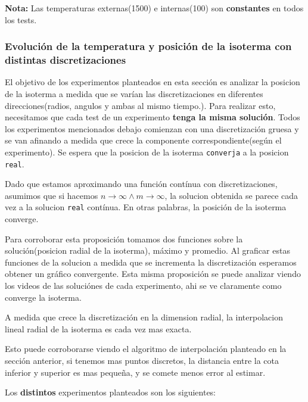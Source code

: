 \textbf{Nota: } Las temperaturas externas(1500) e internas(100) son \textbf{constantes} en todos los tests. 

\subsubsection{Evolución de la temperatura y posición de la isoterma con distintas discretizaciones}

El objetivo de los experimentos planteados en esta sección es analizar la posicion de la isoterma a medida que se varían las discretizaciones en diferentes direcciones(radios, angulos y ambas al mismo tiempo.). Para realizar esto, necesitamos que cada test de un experimento \textbf{tenga la misma solución}. Todos los experimentos mencionados debajo comienzan con una discretización gruesa y se van afinando a medida que crece la componente correspondiente(según el experimento). Se espera que la posicion de la isoterma \texttt{converja} a la posicion \texttt{real}.

\begin{proposition} Dado que estamos aproximando una función contínua con discretizaciones, asumimos que si hacemos $n \to\infty \land m\to\infty$, la solucion obtenida se parece cada vez a la solucion \texttt{real} cont\'inua. En otras palabras, la posición de la isoterma converge.
\end{proposition}

Para corroborar esta proposición tomamos dos funciones sobre la solución(posicion radial de la isoterma), máximo y promedio. Al graficar estas funciones de la solucion a medida que se incrementa la discretización esperamos obtener un gráfico convergente. Esta misma proposición se puede analizar viendo los videos de las soluciónes de cada experimento, ahi se ve claramente como converge la isoterma.

\begin{hipotesis} A medida que crece la discretización en la dimension radial, la interpolacion lineal radial de la isoterma es cada vez mas exacta.
\end{hipotesis}
Esto puede corroborarse viendo el algoritmo de interpolación planteado en la sección anterior, si tenemos mas puntos discretos, la distancia entre la cota inferior y superior es mas pequeña, y se comete menos error al estimar.

\vspace{0.3cm}

Los \textbf{distintos} experimentos planteados son los siguientes:

